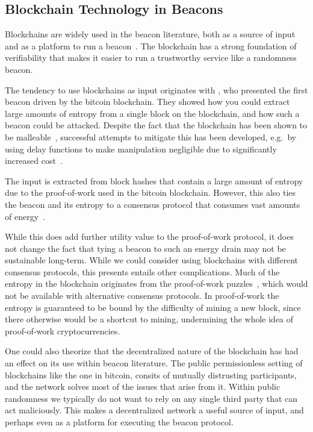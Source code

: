 \subsection{Blockchain Technology in Beacons}

Blockchains are widely used in the beacon literature, both as a source of input~\cite{bonneau2015bitcoin, bentov2016bitcoin, bunz2017proofsof} and as a platform to run a beacon~\cite{randao, bunz2017proofsof}.
The blockchain has a strong foundation of verifiability that makes it easier to run a trustworthy service like a randomness beacon.

The tendency to use blockchains as input originates with \citet{bonneau2015bitcoin}, who presented the first beacon driven by the bitcoin blockchain.
They showed how you could extract large amounts of entropy from a single block on the blockchain, and how such a beacon could be attacked.
Despite the fact that the blockchain has been shown to be malleable~\cite{pierrot2016malleability}, successful attempts to mitigate this has been developed, e.g.\ by using delay functions to make manipulation negligible due to significantly increased cost~\cite{bunz2017proofsof}.

The input is extracted from block hashes that contain a large amount of entropy due to the proof-of-work used in the bitcoin blockchain.
However, this also ties the beacon and its entropy to a consensus protocol that consumes vast amounts of energy~\cite{bitcoinenergy}.

While this does add further utility value to the proof-of-work protocol, it does not change the fact that tying a beacon to such an energy drain may not be sustainable long-term.
While we could consider using blockchains with different consensus protocols, this presents entails other complications.
Much of the entropy in the blockchain originates from the proof-of-work puzzles~\cite{bonneau2015bitcoin}, which would not be available with alternative consensus protocols.
In proof-of-work the entropy is guaranteed to be bound by the difficulty of mining a new block, since there otherwise would be a shortcut to mining, undermining the whole idea of proof-of-work cryptocurrencies.

One could also theorize that the decentralized nature of the blockchain has had an effect on its use within beacon literature.
The public permissionless setting of blockchains like the one in bitcoin, consits of mutually distrusting participants, and the network solves most of the issues that arise from it.
Within public randomness we typically do not want to rely on any single third party that can act maliciously. This makes a decentralized network a useful source of input, and perhaps even as a platform for executing the beacon protocol.

